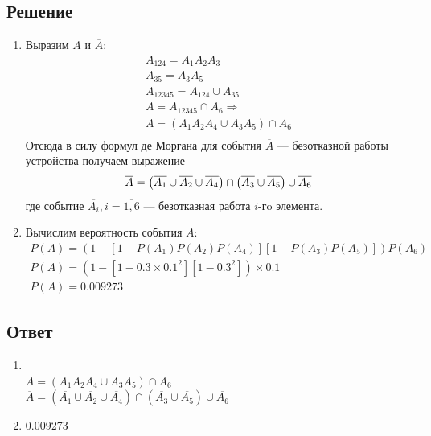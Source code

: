 \documentclass[12pt]{article}
\begin{document}
\subsection*{Решение}
\begin{enumerate}
	\item Выразим $A$ и $\overline{A}$:
	      \begin{gather*}
		      A_{124} = A_1A_2A_3 \\
		      A_{35} = A_3A_5 \\
		      A_{12345} = A_{124} \cup A_{35} \\
		      A = A_{12345} \cap A_6 \Rightarrow \\
		      A = (A_1A_2A_4 \cup A_3A_5) \cap A_6 \\
	      \end{gather*}
	      Отсюда в силу формул де Моргана для события $\overline{A}$ --- безотказной работы устройства получаем выражение
	      \begin{equation*}
		      \overline{A} = \left(\overline{A_1} \cup \overline{A_2} \cup \overline{A_4}\right) \cap \left(\overline{A_3} \cup \overline{A_5}\right) \cup \overline{A_6} \\
	      \end{equation*}
	      где событие $\overline{A_i}, i = \overline{1,6}$ — безотказная работа $i$-гo элемента.
	\item Вычислим вероятность события $A$:
	      \begin{gather*}
		      P(A) = \left(1 - \left[1 - P(A_1)P(A_2)P(A_4)\right]\left[1 - P(A_3)P(A_5)\right]\right)P(A_6) \\
		      P(A) = \left(1 - \left[1 - 0.3 \times 0.1^2\right]\left[1 - 0.3^2\right]\right) \times 0.1 \\
		      P(A) = 0.009273
	      \end{gather*}
\end{enumerate}
\subsection*{Ответ}
\begin{enumerate}
	\item \mbox{}\\
	      $A = (A_1A_2A_4 \cup A_3A_5) \cap A_6$ \\
	      $\overline{A} = \left(\overline{A_1} \cup \overline{A_2} \cup \overline{A_4}\right) \cap \left(\overline{A_3} \cup \overline{A_5}\right) \cup \overline{A_6}$
	\item 0.009273
\end{enumerate}
\end{document}
